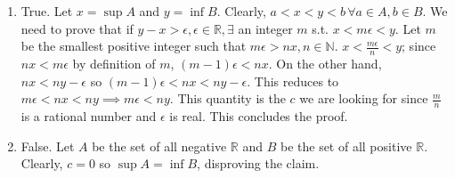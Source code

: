 \documentclass[12pt,letterpaper,boxed]{hmcpset}
\begin{document}
\begin{solution}

\begin{enumerate}
	\itemsep0em
	\item True. Let $x=\sup A$ and $y=\inf B$. Clearly, $a < x < y < b \, \forall a \in A, b \in B.$ We need to prove that if $y - x > \epsilon, \epsilon \in \mathbb{R}, \exists$ an integer $m$ s.t. $x < m\epsilon < y.$ Let $m$ be the smallest positive integer such that $m\epsilon > nx, n\in\mathbb{N}.$ $x < \frac{m\epsilon}{n} < y$; since $nx<m\epsilon$ by definition of $m$, $(m - 1)\epsilon < nx.$ On the other hand, $nx < ny - \epsilon$ so $(m-1)\epsilon < nx < ny - \epsilon.$ This reduces to $m\epsilon < nx < ny \implies m\epsilon < ny.$ This quantity is the $c$ we are looking for since $\frac{m}{n}$ is a rational number and $\epsilon$ is real. This concludes the proof.
	\item False. Let $A$ be the set of all negative $\mathbb{R}$ and $B$ be the set of all positive $\mathbb{R}$. Clearly, $c = 0$ so $\sup A = \inf B$, disproving the claim.
\end{enumerate}

\end{solution}
\end{document}
